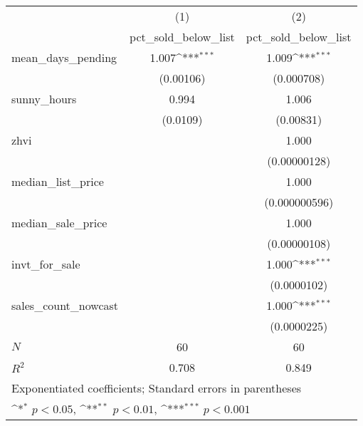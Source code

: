 {
\def\sym#1{\ifmmode^{#1}\else\(^{#1}\)\fi}
\begin{tabular}{l*{2}{c}}
\hline\hline
            &\multicolumn{1}{c}{(1)}&\multicolumn{1}{c}{(2)}\\
            &\multicolumn{1}{c}{pct\_sold\_below\_list}&\multicolumn{1}{c}{pct\_sold\_below\_list}\\
\hline
mean\_days\_pending&       1.007\sym{***}&       1.009\sym{***}\\
            &   (0.00106)         &  (0.000708)         \\
[1em]
sunny\_hours &       0.994         &       1.006         \\
            &    (0.0109)         &   (0.00831)         \\
[1em]
zhvi        &                     &       1.000         \\
            &                     &(0.00000128)         \\
[1em]
median\_list\_price&                     &       1.000         \\
            &                     &(0.000000596)         \\
[1em]
median\_sale\_price&                     &       1.000         \\
            &                     &(0.00000108)         \\
[1em]
invt\_for\_sale&                     &       1.000\sym{***}\\
            &                     & (0.0000102)         \\
[1em]
sales\_count\_nowcast&                     &       1.000\sym{***}\\
            &                     & (0.0000225)         \\
\hline
\(N\)       &          60         &          60         \\
\(R^{2}\)   &       0.708         &       0.849         \\
\hline\hline
\multicolumn{3}{l}{\footnotesize Exponentiated coefficients; Standard errors in parentheses}\\
\multicolumn{3}{l}{\footnotesize \sym{*} \(p<0.05\), \sym{**} \(p<0.01\), \sym{***} \(p<0.001\)}\\
\end{tabular}
}
